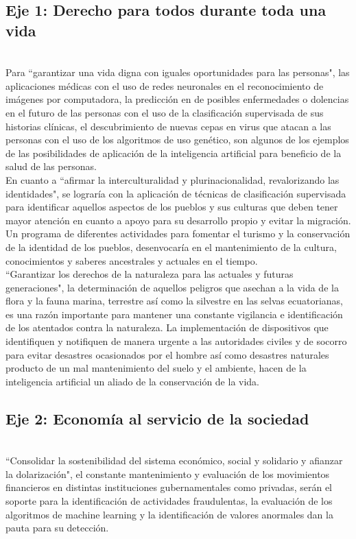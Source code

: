 \documentclass[preprint,12pt,3p]{elsarticle}
\begin{document}
\subsection{Eje 1: Derecho para todos durante toda una vida}
\label{subsec1}\\
Para ``garantizar una vida digna con iguales oportunidades para las personas", las aplicaciones médicas con el uso de redes neuronales en el reconocimiento de imágenes por computadora, la predicción en de posibles enfermedades o dolencias en el futuro de las personas con el uso de la clasificación supervisada de sus historias clínicas, el descubrimiento de nuevas cepas en virus que atacan a las personas con el uso de los algoritmos de uso genético, son algunos de los ejemplos de las posibilidades de aplicación de la inteligencia artificial para beneficio de la salud de las personas.\\

En cuanto a ``afirmar la interculturalidad y plurinacionalidad, revalorizando las identidades", se lograría con la aplicación de técnicas de clasificación supervisada para identificar aquellos aspectos de los pueblos y sus culturas que deben tener mayor atención en cuanto a apoyo para su desarrollo propio y evitar la migración. Un programa de diferentes actividades para fomentar el turismo y la conservación de la identidad de los pueblos, desenvocaría en el mantenimiento de la cultura, conocimientos y saberes ancestrales y actuales en el tiempo.\\

``Garantizar los derechos de la naturaleza para las actuales y futuras generaciones", la determinación de aquellos  peligros que asechan a la vida de la flora y la fauna marina, terrestre así como la silvestre en las selvas ecuatorianas, es una razón importante para mantener una constante vigilancia e identificación de los atentados contra la naturaleza. La implementación de dispositivos que identifiquen y notifiquen de manera urgente a las autoridades civiles y de socorro para evitar desastres ocasionados por el hombre así como desastres naturales producto de un mal mantenimiento del suelo y el ambiente, hacen de la inteligencia artificial un aliado de la conservación de la vida.\\


\subsection{Eje 2: Economía al servicio de la sociedad}
\label{subsec1}\\
``Consolidar la sostenibilidad del sistema económico, social y solidario y afianzar la dolarización", el constante mantenimiento y evaluación de los movimientos financieros en distintas instituciones gubernamentales como privadas, serán el soporte para la identificación de actividades fraudulentas, la evaluación de los algoritmos de machine learning y la identificación de valores anormales dan la pauta para su detección.\\
\end{document}
